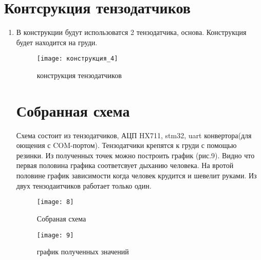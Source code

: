 \section{Контсрукция тензодатчиков}
\begin{enumerate}

\item В конструкции будут использоватся 2 тензодатчика, основа. Конструкция будет находится на груди.

	\begin{figure}[h]
		\centering
		\texttt{[image: конструкция\_4]}
		\caption{конструкция тензодатчиков}
	\end{figure}
\section{Собранная схема}

Схема состоит из тензодатчиков, АЦП HX711, stm32, uart конвертора(для оющения с  COM-портом). Тензодатчики крепятся к груди с помощью резинки. Из полученных точек можно построить график (рис.9). Видно что первая половина графика соответсвует дыханию человека. На вротой половине график зависимости когда человек крудится и шевелит  руками. Из двух тензодаитчиков работает только один.

	\begin{figure}[h]
		\centering
		\texttt{[image: 8]}
		\caption{Собраная схема}
	\end{figure}

	\begin{figure}[h]
		\centering
		\texttt{[image: 9]}
		\caption{график полученных значений}
	\end{figure}	
	
\end{enumerate} 
